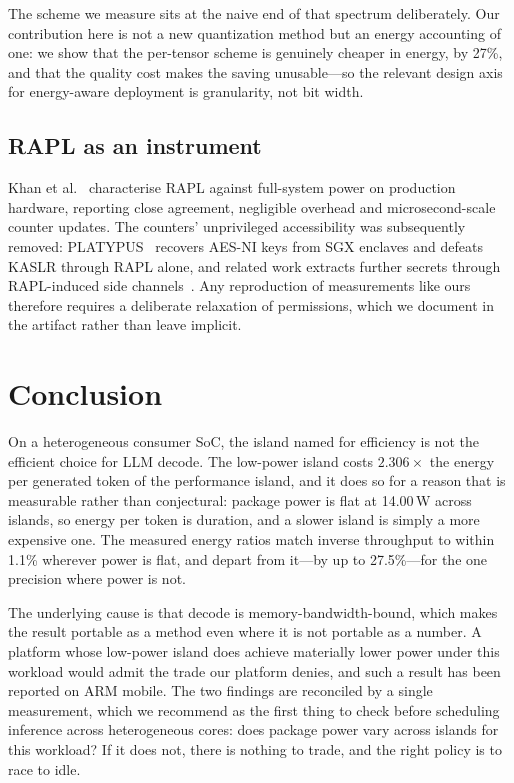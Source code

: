 \documentclass[journal]{IEEEtran}
\begin{document}
The scheme we measure sits at the naive end of that spectrum deliberately. Our
contribution here is not a new quantization method but an energy accounting of
one: we show that the per-tensor scheme is genuinely cheaper in energy, by
27\%, and that the quality cost makes the saving unusable---so the relevant
design axis for energy-aware deployment is granularity, not bit width.

\subsection{RAPL as an instrument}
Khan et al.~\cite{khan2018rapl} characterise RAPL against full-system power on
production hardware, reporting close agreement, negligible overhead and
microsecond-scale counter updates. The counters' unprivileged accessibility was
subsequently removed: PLATYPUS~\cite{lipp2021platypus} recovers AES-NI keys
from SGX enclaves and defeats KASLR through RAPL alone, and related work
extracts further secrets through RAPL-induced side
channels~\cite{zhang2021redalert}. Any reproduction of measurements like ours
therefore requires a deliberate relaxation of permissions, which we document in
the artifact rather than leave implicit.

\section{Conclusion}
On a heterogeneous consumer SoC, the island named for efficiency is not the
efficient choice for LLM decode. The low-power island costs $2.306\times$ the
energy per generated token of the performance island, and it does so for a
reason that is measurable rather than conjectural: package power is flat at
14.00\,W across islands, so energy per token is duration, and a slower island
is simply a more expensive one. The measured energy ratios match inverse
throughput to within 1.1\% wherever power is flat, and depart from it---by up
to 27.5\%---for the one precision where power is not.

The underlying cause is that decode is memory-bandwidth-bound, which makes the
result portable as a method even where it is not portable as a number. A
platform whose low-power island does achieve materially lower power under this
workload would admit the trade our platform denies, and such a result has been
reported on ARM mobile. The two findings are reconciled by a single
measurement, which we recommend as the first thing to check before scheduling
inference across heterogeneous cores: does package power vary across islands
for this workload? If it does not, there is nothing to trade, and the right
policy is to race to idle.
\end{document}
